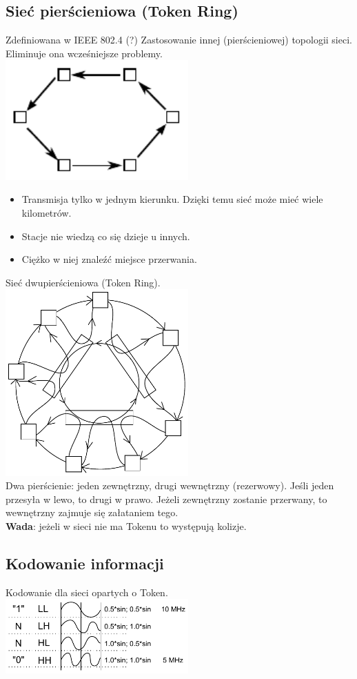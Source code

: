			\subsection{Sieć pierścieniowa (Token Ring)}
				Zdefiniowana w IEEE 802.4 (?)
				Zastosowanie innej (pierścieniowej) topologii sieci. Eliminuje ona wcześniejsze problemy.\\
				\includegraphics[width=7cm]{./images/image29.pdf}
				\begin{itemize}
					\item Transmisja tylko w jednym kierunku. Dzięki temu sieć może mieć wiele kilometrów.
					\item Stacje nie wiedzą co się dzieje u innych.
					\item Ciężko w niej znaleźć miejsce przerwania.
				\end{itemize}
				Sieć dwupierścieniowa (Token Ring).\\
				\includegraphics[width=7cm]{./images/image30.pdf}\\
				Dwa pierścienie: jeden zewnętrzny, drugi wewnętrzny (rezerwowy). Jeśli jeden przesyła w lewo, to drugi w prawo. Jeżeli zewnętrzny zostanie przerwany, to wewnętrzny zajmuje się załataniem tego.\\
				\textbf{Wada}: jeżeli w sieci nie ma Tokenu to występują kolizje.
			\subsection{Kodowanie informacji}
				Kodowanie dla sieci opartych o Token.\\
				\includegraphics[width=7cm]{./images/image31.pdf}\\
